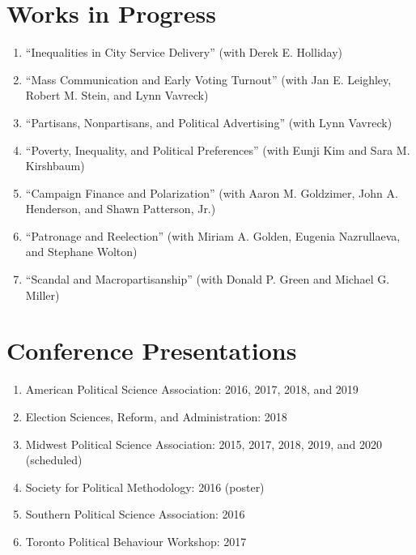 \documentclass[11pt]{article}
\begin{document}
\section*{Works in Progress}

\begin{enumerate}[topsep = 0pt, itemsep = 1ex, partopsep  = 1ex, parsep = 1ex]

	\item[] ``Inequalities in City Service Delivery'' (with Derek E. Holliday)

	\item[] ``Mass Communication and Early Voting Turnout'' (with Jan E. Leighley, Robert M. Stein, and Lynn Vavreck)
	
	\item[] ``Partisans, Nonpartisans, and Political Advertising'' (with Lynn Vavreck) 
	
	\item[] ``Poverty, Inequality, and Political Preferences'' (with Eunji Kim and Sara M. Kirshbaum)
	
	\item[] ``Campaign Finance and Polarization'' (with Aaron M. Goldzimer, John A. Henderson, and Shawn Patterson, Jr.)
	
	\item[] ``Patronage and Reelection'' (with Miriam A. Golden, Eugenia Nazrullaeva, and Stephane Wolton)
	
	\item[] ``Scandal and Macropartisanship'' (with Donald P. Green and Michael G. Miller)

\end{enumerate}

\section*{Conference Presentations}

\begin{enumerate}[topsep = 0pt, itemsep = 1ex, partopsep  = 1ex, parsep = 1ex]
	
	\item[] American Political Science Association: 2016, 2017, 2018, and 2019
	
	\item[] Election Sciences, Reform, and Administration: 2018 
	
	\item[] Midwest Political Science Association: 2015, 2017, 2018, 2019, and 2020 (scheduled)
	
	\item[] Society for Political Methodology: 2016 (poster)
	
	\item[] Southern Political Science Association: 2016
	
	\item[] Toronto Political Behaviour Workshop: 2017
	
\end{enumerate}
\end{document}
